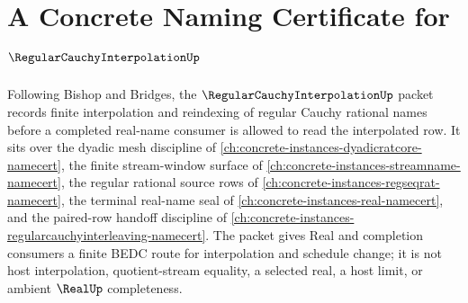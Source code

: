 \chapter{A Concrete Naming Certificate for $\RegularCauchyInterpolationUp$}
\label{ch:concrete-instances-regular-cauchy-interpolation-namecert}

Following Bishop and Bridges, the $\RegularCauchyInterpolationUp$ packet records finite interpolation and reindexing of regular Cauchy rational names before a completed real-name consumer is allowed to read the interpolated row. It sits over the dyadic mesh discipline of \autoref{ch:concrete-instances-dyadicratcore-namecert}, the finite stream-window surface of \autoref{ch:concrete-instances-streamname-namecert}, the regular rational source rows of \autoref{ch:concrete-instances-regseqrat-namecert}, the terminal real-name seal of \autoref{ch:concrete-instances-real-namecert}, and the paired-row handoff discipline of \autoref{ch:concrete-instances-regularcauchyinterleaving-namecert}. The packet gives Real and completion consumers a finite BEDC route for interpolation and schedule change; it is not host interpolation, quotient-stream equality, a selected real, a host limit, or ambient $\RealUp$ completeness.

